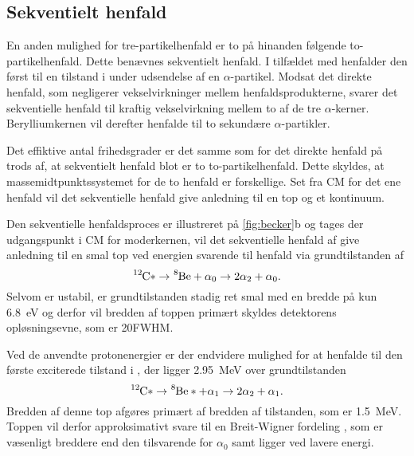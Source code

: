 \subsection{Sekventielt henfald}
\label{sec:sekventielt-henfald}

En anden mulighed for tre-partikelhenfald er to på hinanden følgende to-partikelhenfald. Dette
benævnes sekventielt henfald. I tilfældet med \Carb henfalder den først til en tilstand i \Be under
udsendelse af en $\alpha$-partikel. Modsat det direkte henfald, som negligerer vekselvirkninger mellem
henfaldsprodukterne, svarer det sekventielle henfald til kraftig vekselvirkning mellem to af de tre
$\alpha$-kerner. Berylliumkernen vil derefter henfalde til to sekundære $\alpha$-partikler.

Det effiktive antal frihedsgrader er det samme som for det direkte henfald på trods af, at
sekventielt henfald blot er to to-partikelhenfald. Dette skyldes, at massemidtpunktssystemet for de
to henfald er forskellige. Set fra CM for det ene henfald vil det sekventielle henfald give
anledning til en top og et kontinuum.


Den sekventielle henfaldsproces er illustreret på \cref{fig:becker}b og tages der udgangspunkt i CM
for moderkernen, vil det sekventielle henfald af \Carb give anledning til en smal top ved energien
svarende til henfald via grundtilstanden af \Be
\begin{equation}
  \label{eq:alpha0}
  \Carb* \rightarrow \Be + \alpha_{0} \rightarrow 2\alpha_{2} + \alpha_{0}.
\end{equation}
Selvom \Be er ustabil, er grundtilstanden stadig ret smal med en bredde på kun
\SI{6.8}{\eV} \cite{States} og derfor vil bredden af toppen primært skyldes detektorens
opløsningsevne, som er 20\keV FWHM. 

Ved de anvendte protonenergier er der endvidere mulighed for at henfalde til den første exciterede
tilstand i \Be, der ligger \SI{2.95}{\MeV} over grundtilstanden
\begin{equation}
  \label{eq:alpha0}
  \Carb* \rightarrow \Be* + \alpha_{1} \rightarrow 2\alpha_{2} + \alpha_{1}.
\end{equation}
Bredden af denne top afgøres primært af bredden af \Be tilstanden, som er \SI{1.5}{\MeV}. Toppen vil
derfor approksimativt svare til en Breit-Wigner fordeling \cite[s. 26]{Martin}, som er væsenligt
breddere end den tilsvarende for $\alpha_{0}$ samt ligger ved lavere energi.

